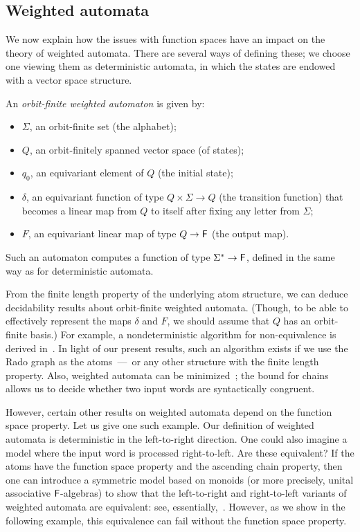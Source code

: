 \subsection{Weighted automata} 
We now explain how the issues with function spaces have an impact on the theory of weighted automata. 
There are several ways of defining these; 
we choose one viewing them as deterministic automata, in which the states are endowed with a vector space structure.  

\begin{definition}\label{def:orbit-finite-weighted}
    An \emph{orbit-finite weighted automaton} is given by: 
    \begin{itemize}
        \item $\Sigma$, an orbit-finite set (the alphabet);
        \item $Q$, an orbit-finitely spanned vector space (of states);
        \item $q_0$, an equivariant element of $Q$ (the initial state);
        \item $\delta$, an equivariant function of type $Q \times \Sigma \to Q$ (the transition function) that becomes a linear map from $Q$ to itself after fixing any  letter from $\Sigma$;
        \item $F$, an equivariant linear map of type $Q \to \mathsf{F}$ (the output map).
    \end{itemize}
    Such an automaton computes a function of type $\Sigma^* \to \mathsf{F}$, defined in the same way as for deterministic automata. 
\end{definition}


From the finite length property of the underlying atom structure, we can deduce decidability results about orbit-finite weighted automata. 
(Though, to be able to effectively represent the maps $\delta$ and $F$, we should assume that $Q$ has an orbit-finite basis.)
For example, a nondeterministic algorithm for non-equivalence is derived in~\cite[Sec.~5]{BFKM24}. 
In light of our present results, such an algorithm exists if we use the Rado graph as the atoms~---~or any other structure with the finite length property. 
Also, weighted automata can be minimized~\cite[Sec.~7]{BFKM24}; 
the bound for chains allows us to decide whether two input words are syntactically congruent.

However, certain other results on weighted automata depend on the function space property. 
Let us give one such example. 
Our definition of weighted automata is deterministic in the left-to-right direction. 
One could also imagine a model where the input word is processed right-to-left. 
Are these equivalent? 
If the atoms have the function space property and the ascending chain property, then one can introduce a symmetric model based on monoids (or more precisely, unital associative $\mathsf{F}$-algebras) to show that 
the left-to-right and right-to-left variants of weighted automata are equivalent: see, essentially,~\cite[Thm.~7.4]{BFKM24}. 
However, as we show in the following example, this equivalence can fail without the function space property.

